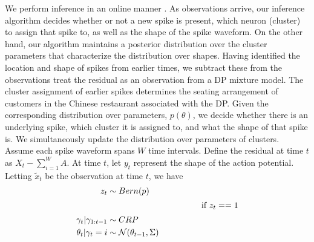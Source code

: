 We perform inference in an online manner \cite{WangDun2009}. As observations arrive, our inference algorithm decides whether or not a 
new spike is present, which neuron (cluster) to assign that spike to, as well as the shape of the spike waveform. On the other hand, our algorithm 
maintains a posterior distribution over the cluster parameters that characterize the distribution over shapes. Having identified the location and shape of 
spikes from earlier times, we subtract these from the observations treat the residual as an observation from a DP mixture model.
The cluster assignment of earlier spikes determines the seating arrangement of customers in the Chinese restaurant associated with the DP. Given the
corresponding distribution over parameters, $p(\theta)$, we decide whether there is an underlying spike, which cluster it is assigned to, and what
the shape of that spike is. We simultaneously update the distribution over parameters of clusters. Assume each spike waveform spans $W$ time intervals. 
Define the residual at time $t$ as $X_t - \sum_{i=1}^W A$. At time $t$, let $y_t$ represent the shape of the action potential.
Letting $\tilde{x}_t$ be the observation at time $t$, we have
\begin{align}
  z_t  & \sim Bern(p) \\
  \intertext{\hspace{2in} if $z_t == 1$}
  \gamma_t| \gamma_{1:t-1} &\sim CRP \\
  \theta_t| \gamma_t = i & \sim \mathcal{N}(\theta_{t-1},\Sigma)
\end{align}
